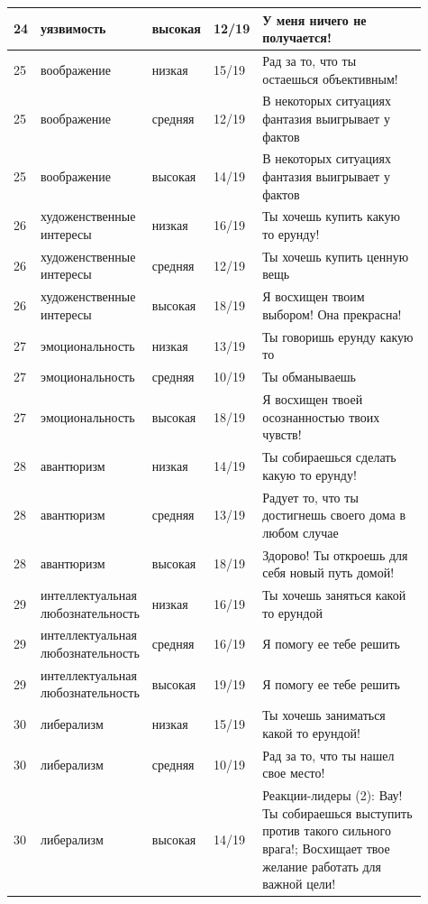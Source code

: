 \begin{landscape}
\begin{longtable}{|p{0.06\linewidth}|p{0.2\linewidth}|p{0.11\linewidth}|p{0.08\linewidth}|p{0.46\linewidth}|}
		24 & уязвимость & высокая & 12/19 & У меня ничего не получается! \\
		\hline
		25 & воображение & низкая & 15/19 & Рад за то, что ты остаешься объективным! \\
		\hline
		25 & воображение & средняя & 12/19 & В некоторых ситуациях фантазия выигрывает у фактов \\
		\hline
		25 & воображение & высокая & 14/19 & В некоторых ситуациях фантазия выигрывает у фактов \\
		\hline
		26 & художенственные интересы & низкая & 16/19 & Ты хочешь купить какую то ерунду! \\
		\hline
		26 & художенственные интересы & средняя & 12/19 & Ты хочешь купить ценную вещь \\
		\hline
		26 & художенственные интересы & высокая & 18/19 & Я восхищен твоим выбором! Она прекрасна! \\
		\hline
		27 & эмоциональность & низкая & 13/19 & Ты говоришь ерунду какую то \\
		\hline
		27 & эмоциональность & средняя & 10/19 & Ты обманываешь \\
		\hline
		27 & эмоциональность & высокая & 18/19 & Я восхищен твоей осознанностью твоих чувств! \\
		\hline
		28 & авантюризм & низкая & 14/19 & Ты собираешься сделать какую то ерунду! \\
		\hline
		28 & авантюризм & средняя & 13/19 & Радует то, что ты достигнешь своего дома в любом случае \\
		\hline
		28 & авантюризм & высокая & 18/19 & Здорово! Ты откроешь для себя новый путь домой! \\
		\hline
		29 & интеллектуальная любознательность & низкая & 16/19 & Ты хочешь заняться какой то ерундой \\
		\hline
		29 & интеллектуальная любознательность & средняя & 16/19 & Я помогу ее тебе решить \\
		\hline
		29 & интеллектуальная любознательность & высокая & 19/19 & Я помогу ее тебе решить \\
		\hline
		30 & либерализм & низкая & 15/19 & Ты хочешь заниматься какой то ерундой! \\
		\hline
		30 & либерализм & средняя & 10/19 & Рад за то, что ты нашел свое место! \\
		\hline
		30 & либерализм & высокая & 14/19 & Реакции-лидеры (2): Вау! Ты собираешься выступить против такого сильного врага!; Восхищает твое желание работать для важной цели! \\
		\hline
	\end{longtable}
	\endgroup
	\end{landscape}

